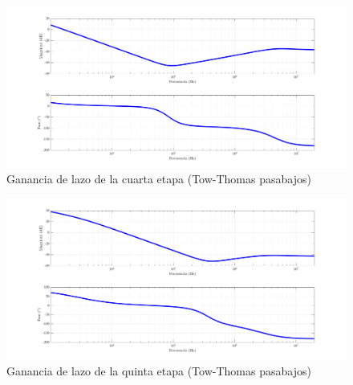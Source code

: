 \begin{figure}[H]
	\centering
	\includegraphics[width = \textwidth]{imagenes/estabilidad_etapa_4_v1}
	\caption{Ganancia de lazo de la cuarta etapa (Tow-Thomas pasabajos)}
	\label{fig:loop_gain_4}
\end{figure}
\begin{figure}[H]
	\centering
	\includegraphics[width = \textwidth]{imagenes/estabilidad_etapa_5_v1}
	\caption{Ganancia de lazo de la quinta etapa (Tow-Thomas pasabajos)}
	\label{fig:loop_gain_5}
\end{figure}